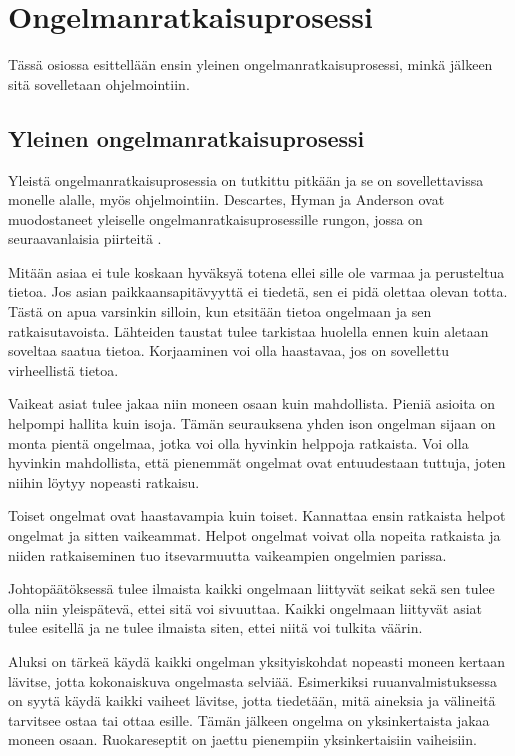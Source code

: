 \section{Ongelmanratkaisuprosessi}

Tässä osiossa esittellään ensin yleinen ongelmanratkaisuprosessi, minkä jälkeen
sitä sovelletaan ohjelmointiin.

\subsection{Yleinen ongelmanratkaisuprosessi}

Yleistä ongelmanratkaisuprosessia on tutkittu pitkään ja se on sovellettavissa
monelle alalle, myös ohjelmointiin. Descartes, Hyman ja Anderson ovat
muodostaneet yleiselle ongelmanratkaisuprosessille rungon, jossa on
seuraavanlaisia piirteitä \cite{Gries:1974:WTI:953057.810447}.

Mitään asiaa ei tule koskaan hyväksyä totena ellei sille ole varmaa ja
perusteltua tietoa. Jos asian paikkaansapitävyyttä ei tiedetä, sen ei pidä
olettaa olevan totta. Tästä on apua varsinkin silloin, kun etsitään tietoa
ongelmaan ja sen ratkaisutavoista. Lähteiden taustat tulee tarkistaa huolella
ennen kuin aletaan soveltaa saatua tietoa. Korjaaminen voi olla haastavaa, jos
on sovellettu virheellistä tietoa.

Vaikeat asiat tulee jakaa niin moneen osaan kuin mahdollista. Pieniä asioita on
helpompi hallita kuin isoja. Tämän seurauksena yhden ison ongelman sijaan on
monta pientä ongelmaa, jotka voi olla hyvinkin helppoja ratkaista. Voi olla
hyvinkin mahdollista, että pienemmät ongelmat ovat entuudestaan tuttuja, joten
niihin löytyy nopeasti ratkaisu.

Toiset ongelmat ovat haastavampia kuin toiset. Kannattaa ensin ratkaista helpot
ongelmat ja sitten vaikeammat. Helpot ongelmat voivat olla nopeita ratkaista ja
niiden ratkaiseminen tuo itsevarmuutta vaikeampien ongelmien parissa.

Johtopäätöksessä tulee ilmaista kaikki ongelmaan liittyvät seikat sekä sen tulee
olla niin yleispätevä, ettei sitä voi sivuuttaa. Kaikki ongelmaan liittyvät
asiat tulee esitellä ja ne tulee ilmaista siten, ettei niitä voi tulkita väärin.

Aluksi on tärkeä käydä kaikki ongelman yksityiskohdat nopeasti moneen kertaan
lävitse, jotta kokonaiskuva ongelmasta selviää. Esimerkiksi ruuanvalmistuksessa
on syytä käydä kaikki vaiheet lävitse, jotta tiedetään, mitä aineksia ja
välineitä tarvitsee ostaa tai ottaa esille. Tämän jälkeen ongelma on
yksinkertaista jakaa moneen osaan. Ruokareseptit on jaettu pienempiin
yksinkertaisiin vaiheisiin.

